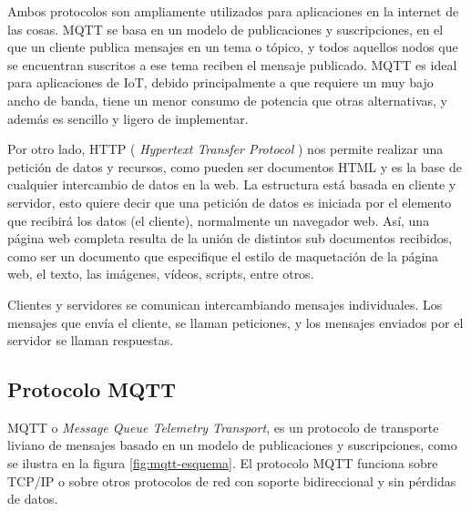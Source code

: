 Ambos protocolos son ampliamente utilizados para aplicaciones en la internet de las cosas.  MQTT se basa en un modelo de publicaciones y suscripciones, en el que un cliente publica mensajes en un tema o tópico, y todos aquellos nodos que se encuentran suscritos a ese tema reciben el mensaje publicado. MQTT es ideal para aplicaciones de IoT, debido principalmente a que requiere un muy bajo ancho de banda, tiene un menor consumo de potencia que otras alternativas, y además es sencillo y ligero de implementar. 

Por otro lado, HTTP \citep{WEBSITE:14} (\textit{ Hypertext Transfer Protocol} ) nos permite realizar una petición de datos y recursos, como pueden ser documentos HTML \citep{BOOK:2} y es la base de cualquier intercambio de datos en la web. La estructura está basada en cliente y servidor, esto quiere decir que una petición de datos es iniciada por el elemento que recibirá los datos (el cliente), normalmente un navegador web.   Así,  una página web completa resulta de la unión de distintos sub documentos recibidos, como ser un documento que especifique el estilo de maquetación de la página web, el texto, las imágenes, vídeos, scripts, entre otros. 

Clientes y servidores se comunican intercambiando mensajes individuales. Los mensajes que envía el cliente, se llaman peticiones, y los mensajes enviados por el servidor se llaman respuestas.


\subsection{Protocolo MQTT}
\label{mqtt-section}
MQTT o \textit{ Message Queue Telemetry Transport}, es un protocolo de transporte liviano de mensajes basado en un modelo de publicaciones y suscripciones, como se ilustra en la figura \ref{fig:mqtt-esquema}. El protocolo MQTT funciona sobre TCP/IP o sobre otros protocolos de red con soporte bidireccional y sin pérdidas de datos.

